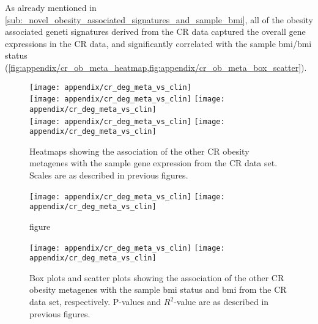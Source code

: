 \begin{appendices}
	As already mentioned in \cref{sub:_novel_obesity_associated_signatures_and_sample_bmi}, all of the obesity associated geneti signatures derived from the CR data captured the overall gene expressions in the CR data, and significantly correlated with the sample \gls{bmi}/\gls{bmi} status (\cref{fig:appendix/cr_ob_meta_heatmap,fig:appendix/cr_ob_meta_box_scatter}).

	\begin{figure}[htp!]
		\centering
		\texttt{[image: appendix/cr\_deg\_meta\_vs\_clin]}\\
		\vspace{1em}
		\texttt{[image: appendix/cr\_deg\_meta\_vs\_clin]}
		\hfill
		\texttt{[image: appendix/cr\_deg\_meta\_vs\_clin]}\\
		\vspace{1em}
		\texttt{[image: appendix/cr\_deg\_meta\_vs\_clin]}
		\hfill
		\texttt{[image: appendix/cr\_deg\_meta\_vs\_clin]}\\
		\caption{Heatmaps showing the association of the other CR obesity metagenes with the sample gene expression from the CR data set.
	Scales are as described in previous figures.}
		\label{fig:appendix/cr_ob_meta_heatmap}
	\end{figure}

	\begin{figure}[htpb]
		\ContinuedFloat
		\captionsetup{list=off,format=cont}
		\centering
		\texttt{[image: appendix/cr\_deg\_meta\_vs\_clin]}
		\hfill
		\texttt{[image: appendix/cr\_deg\_meta\_vs\_clin]}\\
		\vspace{1em}
		\caption{figure}
	\end{figure}

	\begin{figure}[htpb]
		\centering
		\texttt{[image: appendix/cr\_deg\_meta\_vs\_clin]}
		\hfill
		\texttt{[image: appendix/cr\_deg\_meta\_vs\_clin]}\\
		\caption{Box plots and scatter plots showing the association of the other CR obesity metagenes with the sample \gls{bmi} status  and \gls{bmi} from the CR data set, respectively.
	P-values and $R^2$-value are as described in previous figures.}
		\label{fig:appendix/cr_ob_meta_box_scatter}
	\end{figure}


\end{appendices}
